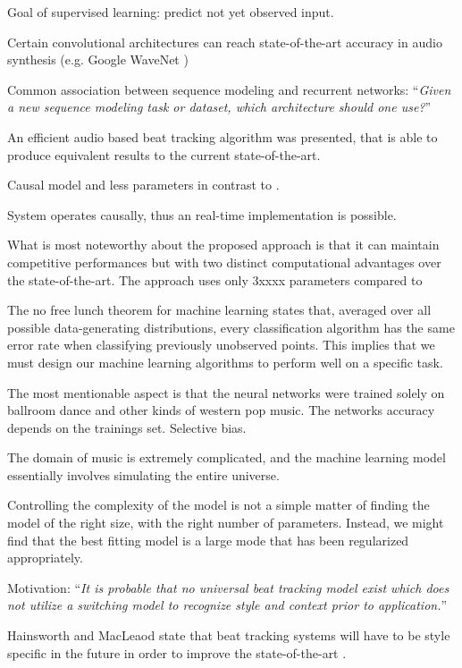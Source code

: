 \documentclass{scrartcl}
\begin{document}
Goal of supervised learning: predict not yet observed input.

Certain convolutional architectures can reach state-of-the-art accuracy in audio synthesis (e.g. Google WaveNet \cite{Oord2016})

Common association between sequence modeling and recurrent networks: ``\emph{Given a new sequence modeling task or dataset, which architecture should one use?}'' \cite{Bai2018}




An efficient audio based beat tracking algorithm was presented, that is able to produce equivalent results to the current state-of-the-art. 

Causal model and less parameters in contrast to \cite{Boeck2014}.

System operates causally, thus an real-time implementation is possible.

What is most noteworthy about the proposed approach is that it can maintain competitive performances but with two distinct computational advantages over the state-of-the-art. The approach uses only 3xxxx parameters compared to 




The no free lunch theorem for machine learning \cite{Wolpert1996} states that, averaged over all possible data-generating distributions, every classification algorithm has the same error rate when classifying previously unobserved points. This implies that we must design our machine learning algorithms to perform well on a specific task.

The most mentionable aspect is that the neural networks were trained solely on ballroom dance and other kinds of western pop music. The networks accuracy depends on the trainings set. Selective bias. 

The domain of music is extremely complicated, and the machine learning model essentially involves simulating the entire universe.

Controlling the complexity of the model is not a simple matter of finding the model of the right size, with the right number of parameters. Instead, we might find that the best fitting model is a large mode that has been regularized appropriately.

Motivation: ``\emph{It is probable that no universal beat tracking model exist which does not utilize a switching model to recognize style and context prior to application.}'' \cite{Collins2006}

Hainsworth and MacLeaod state that beat tracking systems will have to be style specific in the future in order to improve the state-of-the-art \cite{Hainsworth2004}.
\end{document}
